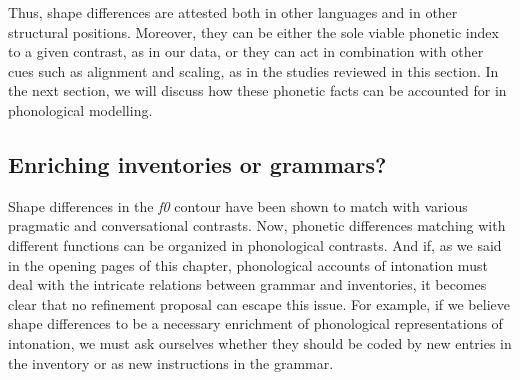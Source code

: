 Thus, shape differences are attested both in other languages and in other structural positions. Moreover, they can be either the sole viable phonetic index to a given contrast, as in our data, or they can act in combination with other cues such as alignment and scaling, as in the studies reviewed in this section. In the next section, we will discuss how these phonetic facts can be accounted for in phonological modelling.

\subsection{Enriching inventories or grammars?}\label{sec242}
Shape differences in the \textit{f0} contour have been shown to match with various pragmatic and conversational contrasts. Now, phonetic differences matching with different functions can be organized in phonological contrasts. And if, as we said in the opening pages of this chapter, phonological accounts of intonation must deal with the intricate relations between grammar and inventories, it becomes clear that no refinement proposal can escape this issue. For example, if we believe shape differences to be a necessary enrichment of phonological representations of intonation, we must ask ourselves whether they should be coded by new entries in the inventory or as new instructions in the grammar.

